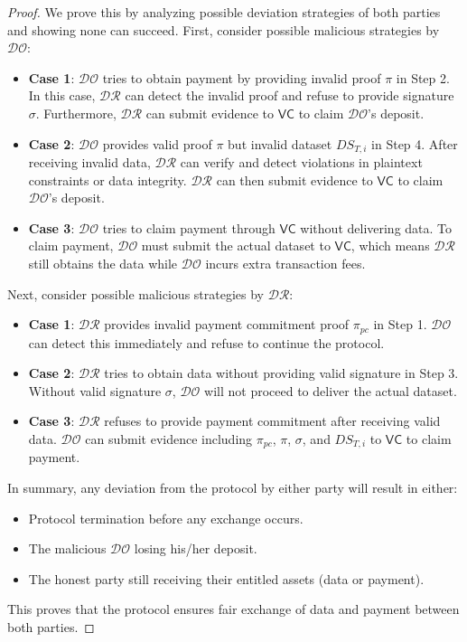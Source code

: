 \documentclass[journal]{IEEEtran}
\begin{document}
\begin{proof}
    We prove this by analyzing possible deviation strategies of both parties and showing none can succeed. First, consider possible malicious strategies by $\mathcal{DO}$:
    \begin{itemize}
        \item \textbf{Case 1}: $\mathcal{DO}$ tries to obtain payment by providing invalid proof $\pi$ in Step 2. In this case, $\mathcal{DR}$ can detect the invalid proof and refuse to provide signature $\sigma$. Furthermore, $\mathcal{DR}$ can submit evidence to $\mathsf{VC}$ to claim $\mathcal{DO}$'s deposit.
        
        \item \textbf{Case 2}: $\mathcal{DO}$ provides valid proof $\pi$ but invalid dataset $DS_{T,i}$ in Step 4. After receiving invalid data, $\mathcal{DR}$ can verify and detect violations in plaintext constraints or data integrity. $\mathcal{DR}$ can then submit evidence to $\mathsf{VC}$ to claim $\mathcal{DO}$'s deposit.

        \item \textbf{Case 3}: $\mathcal{DO}$ tries to claim payment through $\mathsf{VC}$ without delivering data. To claim payment, $\mathcal{DO}$ must submit the actual dataset to $\mathsf{VC}$, which means $\mathcal{DR}$ still obtains the data while $\mathcal{DO}$ incurs extra transaction fees.
    \end{itemize}
    Next, consider possible malicious strategies by $\mathcal{DR}$:
    \begin{itemize}
        \item \textbf{Case 1}: $\mathcal{DR}$ provides invalid payment commitment proof $\pi_{pc}$ in Step 1. $\mathcal{DO}$ can detect this immediately and refuse to continue the protocol.

        \item \textbf{Case 2}: $\mathcal{DR}$ tries to obtain data without providing valid signature in Step 3. Without valid signature $\sigma$, $\mathcal{DO}$ will not proceed to deliver the actual dataset.

        \item \textbf{Case 3}: $\mathcal{DR}$ refuses to provide payment commitment after receiving valid data. $\mathcal{DO}$ can submit evidence including $\pi_{pc}$, $\pi$, $\sigma$, and $DS_{T,i}$ to $\mathsf{VC}$ to claim payment.
    \end{itemize}
    In summary, any deviation from the protocol by either party will result in either:
    \begin{itemize}
        \item Protocol termination before any exchange occurs.
        \item The malicious $\mathcal{DO}$ losing his/her deposit.
        \item The honest party still receiving their entitled assets (data or payment).
    \end{itemize}
    This proves that the protocol ensures fair exchange of data and payment between both parties.
\end{proof}
\end{document}
